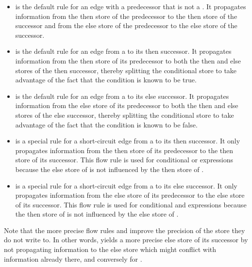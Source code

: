 \begin{itemize}
    \item {} is the default rule for an edge with a
      predecessor that is not a .  It
      propagates information from the then store of the predecessor to
      the then store of the successor and from the else store of the
      predecessor to the else store of the successor.
    \item {} is the default rule for an edge from a
       to its then successor.  It propagates
      information from the then store of its predecessor to both the
      then and else stores of the then successor, thereby splitting
      the conditional store to take advantage of the fact that the
      condition is known to be true.
    \item {} is the default rule for an edge from a
       to its else successor.  It propagates
      information from the else store of its predecessor to both the
      then and else stores of the else successor, thereby splitting
      the conditional store to take advantage of the fact that the
      condition is known to be false.
    \item {} is a special rule for a short-circuit edge
      from a  to its then successor.  It only
      propagates information from the then store of its predecessor to
      the then store of its successor.  This flow rule is used for
      conditional or expressions because the else store of  is not influenced by the then store of .
    \item {} is a special rule for a short-circuit edge
      from a  to its else successor.  It only
      propagates information from the else store of its predecessor to
      the else store of its successor.  This flow rule is used for
      conditional and expressions because the then store of  is not influenced by the else store of .
\end{itemize}

Note that the more precise flow rules  and
 improve the precision of the store they do not
write to.  In other words,  yields a more precise
else store of its successor by not propagating information to the else
store which might conflict with information already there, and
conversely for .

